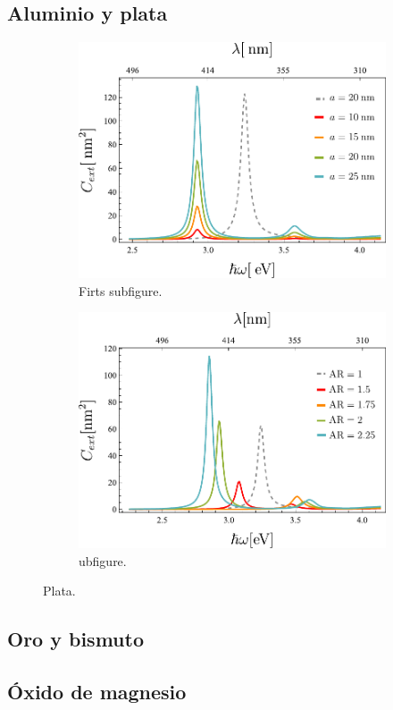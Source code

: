 \subsection*{Aluminio y plata}
\begin{figure}
	\centering
	\begin{subfigure}{0.49\textwidth}
		\includegraphics[width=\textwidth]{../../Figuras/AgAR}
		\caption{Firts subfigure.}
		\label{fig:first}
	\end{subfigure}
	\hfill
	\begin{subfigure}{0.49\textwidth}
		\includegraphics[width=\textwidth]{../../Figuras/Agc}
		\caption{ubfigure.}
		\label{fig:second}
	\end{subfigure}
	
	\caption{Plata.}
	\label{fig:figures}
\end{figure}


\subsection*{Oro y bismuto}

\subsection*{Óxido de magnesio}







